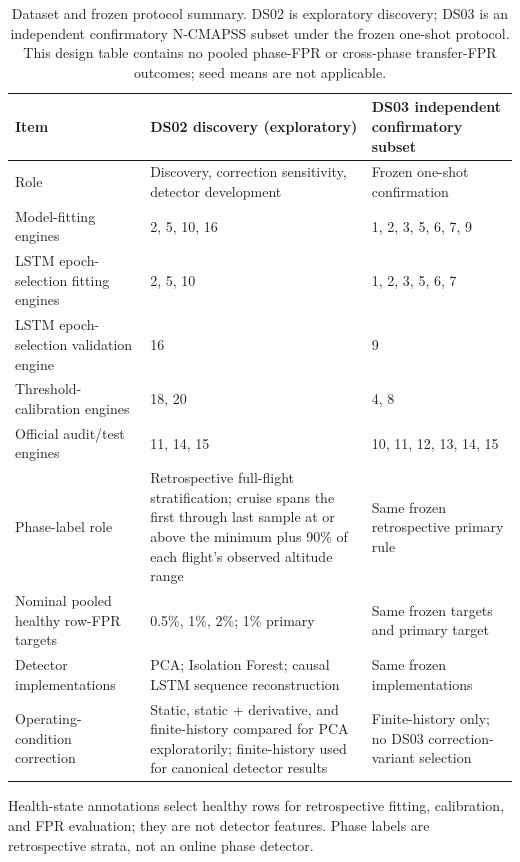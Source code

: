 \documentclass[10pt,twocolumn]{article}
\begin{document}
\begin{table}[t]
\centering
\footnotesize
\caption{Dataset and frozen protocol summary. DS02 is exploratory discovery; DS03 is an independent confirmatory N-CMAPSS subset under the frozen one-shot protocol. This design table contains no pooled phase-FPR or cross-phase transfer-FPR outcomes; seed means are not applicable.}
\begin{tabular}{p{}p{}p{}}
\hline
Item & DS02 discovery (exploratory) & DS03 independent confirmatory subset \\
\hline
Role & Discovery, correction sensitivity, detector development & Frozen one-shot confirmation \\
Model-fitting engines & 2, 5, 10, 16 & 1, 2, 3, 5, 6, 7, 9 \\
LSTM epoch-selection fitting engines & 2, 5, 10 & 1, 2, 3, 5, 6, 7 \\
LSTM epoch-selection validation engine & 16 & 9 \\
Threshold-calibration engines & 18, 20 & 4, 8 \\
Official audit/test engines & 11, 14, 15 & 10, 11, 12, 13, 14, 15 \\
Phase-label role & Retrospective full-flight stratification; cruise spans the first through last sample at or above the minimum plus 90\% of each flight's observed altitude range & Same frozen retrospective primary rule \\
Nominal pooled healthy row-FPR targets & 0.5\%, 1\%, 2\%; 1\% primary & Same frozen targets and primary target \\
Detector implementations & PCA; Isolation Forest; causal LSTM sequence reconstruction & Same frozen implementations \\
Operating-condition correction & Static, static + derivative, and finite-history compared for PCA exploratorily; finite-history used for canonical detector results & Finite-history only; no DS03 correction-variant selection \\
\hline
\end{tabular}
\par\vspace{3pt}\footnotesize Health-state annotations select healthy rows for retrospective fitting, calibration, and FPR evaluation; they are not detector features. Phase labels are retrospective strata, not an online phase detector.
\end{table}
\end{document}
